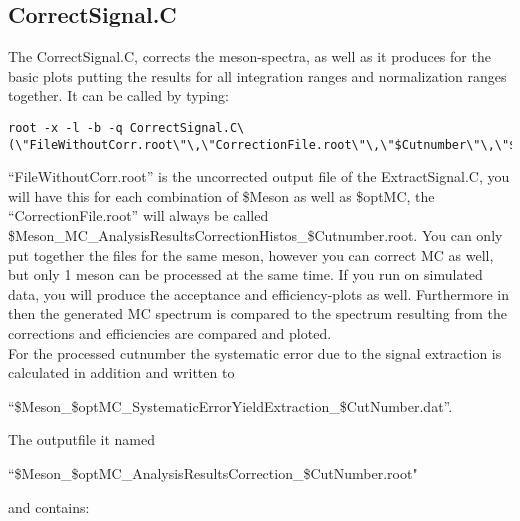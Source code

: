 		\subsection{CorrectSignal.C}
		The CorrectSignal.C, corrects the meson-spectra, as well as it produces for the basic plots putting the results for all integration ranges and normalization ranges together. It can be called by typing: 
		\begin{lstlisting}
root -x -l -b -q CorrectSignal.C\(\"FileWithoutCorr.root\"\,\"CorrectionFile.root\"\,\"$Cutnumber\"\,\"$Suffix\"\,\"$Meson\"\,\"$optMC\"\,\"$optEn\"\,\"$optMult\"\,\"$optConf\"\)	
		\end{lstlisting}
		``FileWithoutCorr.root'' is the uncorrected output file of the ExtractSignal.C, you will have this for each combination of \$Meson as well as \$optMC, the ``CorrectionFile.root'' will always be called \$Meson\_MC\_AnalysisResultsCorrectionHistos\_\$Cutnumber.root. You can only put together the files for the same meson, however you can correct MC as well, but only 1 meson can be processed at the same time. If you run on simulated data, you will produce the acceptance and efficiency-plots as well. Furthermore in then the generated MC spectrum is compared to the spectrum resulting from the corrections and efficiencies are compared and ploted. \\
		For the processed cutnumber the systematic error due to the signal extraction is calculated in addition and written to 
		\begin{center}
			``\$Meson\_\$optMC\_SystematicErrorYieldExtraction\_\$CutNumber.dat''. 
		\end{center}
		The outputfile it named \begin{center}``\$Meson\_\$optMC\_AnalysisResultsCorrection\_\$CutNumber.root" \end{center} and contains: 
